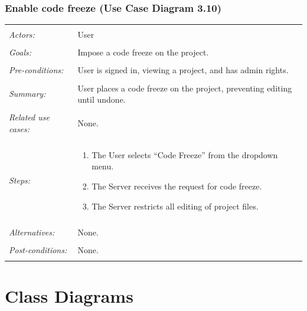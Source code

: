 \documentclass[11pt]{report}
\begin{document}
\subsection{Enable code freeze (Use Case Diagram 3.10)}
    \begin{tabular}{ p{2cm} p{12cm} }
     \hline
     \\
     \textit{Actors:} & User \\ 
     \\
     \textit{Goals:} & Impose a code freeze on the project. \\
     \\
     \textit{Pre-conditions:} & User is signed in, viewing a project, and has admin rights.\\
     \\
     \textit{Summary:} & User places a code freeze on the project, preventing editing until undone. \\
     \\
     \textit{Related use cases:} & None. \\ 
     \\
     \textit{Steps:} & \begin{enumerate}
        \item The User selects ``Code Freeze'' from the dropdown menu.
        \item The Server receives the request for code freeze.
        \item The Server restricts all editing of project files.
     \end{enumerate} \\
     \\
     \textit{Alternatives:} & None. \\
     \\
     \textit{Post-conditions:} & None. \\
     \\
    \hline
\end{tabular}



\chapter{Class Diagrams}
\end{document}

